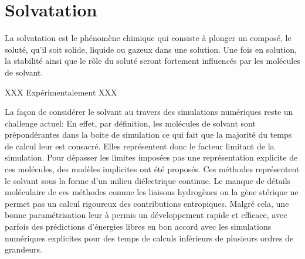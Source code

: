 


\section{Solvatation}
La solvatation est le phénomène chimique qui consiste à plonger un composé, le soluté, qu'il soit solide, liquide ou gazeux dans une solution. Une fois en solution, la stabilité ainsi que le rôle du soluté seront fortement influencés par les molécules de solvant\cite{NickPace_protein_2004,levy_water_2004,Meyer_internal_1992,Ladbury_just_1996,GarcaSosa_hydration_2013,Lemieux_how_1996,Tame_role_1996,Li_effect_2005,Snyder_mechanism_2011,Wang_ligand_2011,Mobley_binding_2009,Barillari2007,Olano_hydration_2004,Bren_individual_2012,Ahmed_bound_2011,VAIANA_molecular_2006,Genheden_accurate_2011,Abel_contribution_2011,Biela_ligand_2012,Stegmann_thermodynamic_2009}. 

XXX Expérimentalement XXX



La façon de considérer le solvant au travers des simulations numériques reste un challenge actuel: En effet, par définition, les molécules de solvant sont prépondérantes dans la boite de simulation ce qui fait que la majorité du temps de calcul leur est consacré. Elles représentent donc le facteur limitant de la simulation. Pour dépasser les limites imposées pas une représentation explicite de ces molécules, des modèles implicites ont été proposés. Ces méthodes représentent le solvant sous la forme d'un milieu diélectrique continue. Le manque de détails moléculaire de ces méthodes comme les liaisons hydrogènes ou la gène stérique ne permet pas un calcul rigoureux des contributions entropiques. Malgré cela, une bonne paramétrisation leur à permis un développement rapide et efficace, avec parfois des prédictions d'énergies libres en bon accord avec les simulations numériques explicites pour des temps de calculs inférieurs de plusieurs ordres de grandeurs. 

